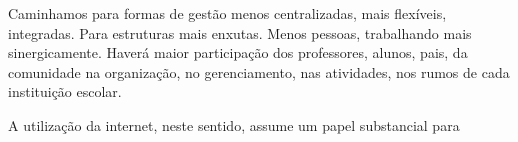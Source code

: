 \begin{citacao}
    Caminhamos para formas de gestão menos centralizadas, mais flexíveis, integradas. Para estruturas mais enxutas. Menos pessoas, trabalhando mais sinergicamente. Haverá maior participação dos professores, alunos, pais, da comunidade na organização, no gerenciamento, nas atividades, nos rumos de cada instituição escolar.
\end{citacao}

A utilização da internet, neste sentido, assume um papel substancial para \cite{velloso2014informatica}






